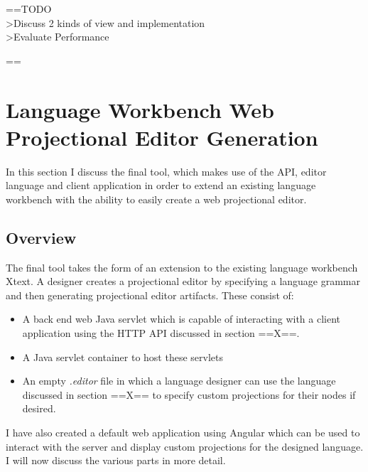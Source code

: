 \documentclass{article}
\begin{document}
==TODO 
\\>Discuss 2 kinds of view and implementation
\\>Evaluate Performance



==




\section{Language Workbench Web Projectional Editor Generation}
In this section I discuss the final tool, which makes use of the API, editor language and client application in order to extend an existing language workbench with the ability to easily create a web projectional editor.
\subsection{Overview}
The final tool takes the form of an extension to the existing language workbench Xtext. A designer creates a projectional editor by specifying a language grammar and then generating projectional editor artifacts. These consist of:
\begin{itemize}
\item A back end web Java servlet which is capable of interacting with a client application using the HTTP API discussed in section ==X==.
\item A Java servlet container to host these servlets
\item An empty \emph{.editor} file in which a language designer can use the language discussed in section ==X== to specify custom projections for their nodes if desired.  
\end{itemize}
I have also created a default web application using Angular which can be used to interact with the server and display custom projections for the designed language. I will now discuss the various parts in more detail.
\end{document}
